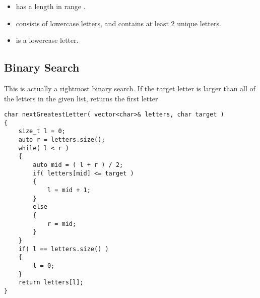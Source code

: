 \begin{itemize}
\item {} has a length in range \fcj{[2, 10000]}.
\item {} consists of lowercase letters, and contains at least 2 unique letters.
\item {} is a lowercase letter.
\end{itemize}

\subsection{Binary Search}
This is actually a rightmost binary search. If the target letter is larger than all of the letters in the given list, returns the first letter

\setcounter{lstlisting}{0}
\begin{lstlisting}[style=customc, caption={Binary Search}]
char nextGreatestLetter( vector<char>& letters, char target )
{
    size_t l = 0;
    auto r = letters.size();
    while( l < r )
    {
        auto mid = ( l + r ) / 2;
        if( letters[mid] <= target )
        {
            l = mid + 1;
        }
        else
        {
            r = mid;
        }
    }
    if( l == letters.size() )
    {
        l = 0;
    }
    return letters[l];
}
\end{lstlisting}